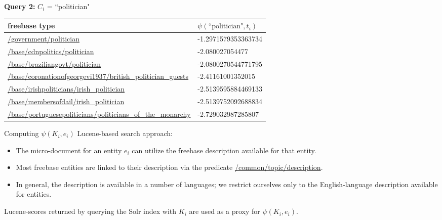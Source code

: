 \documentclass[pdf,11pt]{beamer}
\begin{document}
\begin{frame}{}

\textbf{Query 2:} $C_{i}$ = ``politician"

\begin{longtable}{| p{} | p{} |}
\hline
\textbf{freebase type} & $\psi(\text{``politician"}, t_i)$ \\ \hline \hline

\url{/government/politician} & -1.2971579353363734 \\ \hline
\url{/base/cdnpolitics/politician} & -2.080027054477 \\ \hline
\url{/base/braziliangovt/politician} & -2.0800270544771795 \\ \hline
\url{/base/coronationofgeorgevi1937/british_politician_guests} & -2.41161001352015 \\ \hline
\url{/base/irishpoliticians/irish_politician} & -2.5139595884469133 \\ \hline
\url{/base/membersofdail/irish_politician} & -2.5139752092688834 \\ \hline
\url{/base/portuguesepoliticians/politicians_of_the_monarchy} & -2.729032987285807 \\ \hline

\end{longtable}

\end{frame}

\begin{frame}{Computing $\psi(K_i, e_i)$}
Lucene-based search approach:

\begin{itemize}
\item The micro-document for an entity $e_i$ can utilize the freebase description available for that entity.
\item Most freebase entities are linked to their description via the predicate \url{/common/topic/description}.
\item In general, the description is available in a number of languages; we restrict ourselves only to the English-language description available for entities.
\end{itemize}

Lucene-scores returned by querying the Solr index with $K_i$ are used as a proxy for $\psi(K_i, e_i)$.
\end{frame}
\end{document}
